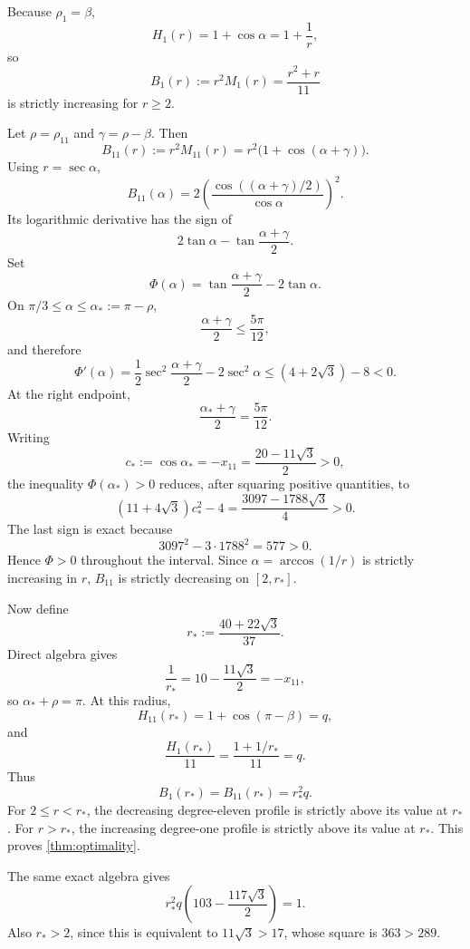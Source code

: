 Because $\rho_1=\beta$,
\[
 H_1(r)=1+\cos\alpha=1+\frac1r,
\]
so
\begin{equation}\label{eq:B1}
 B_1(r):=r^2M_1(r)=\frac{r^2+r}{11}
\end{equation}
is strictly increasing for $r\ge2$.

Let $\rho=\rho_{11}$ and $\gamma=\rho-\beta$.  Then
\begin{equation}\label{eq:B11}
 B_{11}(r):=r^2M_{11}(r)
 =r^2\bigl(1+\cos(\alpha+\gamma)\bigr).
\end{equation}
Using $r=\sec\alpha$,
\[
 B_{11}(\alpha)
 =2\left(\frac{\cos((\alpha+\gamma)/2)}{\cos\alpha}\right)^2.
\]
Its logarithmic derivative has the sign of
\[
 2\tan\alpha-\tan\frac{\alpha+\gamma}{2}.
\]
Set
\[
 \Phi(\alpha)=\tan\frac{\alpha+\gamma}{2}-2\tan\alpha.
\]
On $\pi/3\le\alpha\le\alpha_*:=\pi-\rho$,
\[
 \frac{\alpha+\gamma}{2}\le\frac{5\pi}{12},
\]
and therefore
\[
 \Phi'(\alpha)
 =\frac12\sec^2\frac{\alpha+\gamma}{2}-2\sec^2\alpha
 \le(4+2\sqrt3)-8<0.
\]
At the right endpoint,
\[
 \frac{\alpha_*+\gamma}{2}=\frac{5\pi}{12}.
\]
Writing
\[
 c_*:=\cos\alpha_*=-x_{11}=\frac{20-11\sqrt3}{2}>0,
\]
the inequality $\Phi(\alpha_*)>0$ reduces, after squaring positive quantities,
to
\[
 (11+4\sqrt3)c_*^2-4
 =\frac{3097-1788\sqrt3}{4}>0.
\]
The last sign is exact because
\[
 3097^2-3\cdot1788^2=577>0.
\]
Hence $\Phi>0$ throughout the interval.  Since $\alpha=\arccos(1/r)$
is strictly increasing in $r$, $B_{11}$ is strictly decreasing on $[2,r_*]$.

Now define
\begin{equation}\label{eq:rstaragain}
 r_*:=\frac{40+22\sqrt3}{37}.
\end{equation}
Direct algebra gives
\begin{equation}\label{eq:reciprocal}
 \frac1{r_*}=10-\frac{11\sqrt3}{2}=-x_{11},
\end{equation}
so $\alpha_*+\rho=\pi$.  At this radius,
\[
 H_{11}(r_*)=1+\cos(\pi-\beta)=q,
\]
and
\[
 \frac{H_1(r_*)}{11}=\frac{1+1/r_*}{11}=q.
\]
Thus
\begin{equation}\label{eq:crossing}
 B_1(r_*)=B_{11}(r_*)=r_*^2q.
\end{equation}
For $2\le r<r_*$, the decreasing degree-eleven profile is strictly above its
value at $r_*$.  For $r>r_*$, the increasing degree-one profile is strictly above
its value at $r_*$.  This proves \cref{thm:optimality}.

The same exact algebra gives
\begin{equation}\label{eq:localidentity}
 r_*^2q\left(103-\frac{117\sqrt3}{2}\right)=1.
\end{equation}
Also $r_*>2$, since this is equivalent to $11\sqrt3>17$, whose square is
$363>289$.
